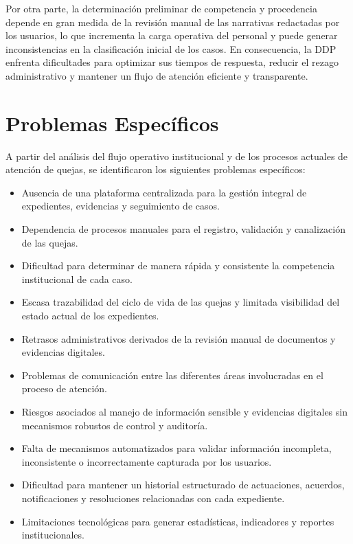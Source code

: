 Por otra parte, la determinación preliminar de competencia y procedencia depende en gran medida de la revisión manual de las narrativas redactadas por los usuarios, lo que incrementa la carga operativa del personal y puede generar inconsistencias en la clasificación inicial de los casos. En consecuencia, la DDP enfrenta dificultades para optimizar sus tiempos de respuesta, reducir el rezago administrativo y mantener un flujo de atención eficiente y transparente.

\section{Problemas Específicos}

A partir del análisis del flujo operativo institucional y de los procesos actuales de atención de quejas, se identificaron los siguientes problemas específicos:

\begin{itemize}

    \item Ausencia de una plataforma centralizada para la gestión integral de expedientes, evidencias y seguimiento de casos.

    \item Dependencia de procesos manuales para el registro, validación y canalización de las quejas.

    \item Dificultad para determinar de manera rápida y consistente la competencia institucional de cada caso.

    \item Escasa trazabilidad del ciclo de vida de las quejas y limitada visibilidad del estado actual de los expedientes.

    \item Retrasos administrativos derivados de la revisión manual de documentos y evidencias digitales.

    \item Problemas de comunicación entre las diferentes áreas involucradas en el proceso de atención.

    \item Riesgos asociados al manejo de información sensible y evidencias digitales sin mecanismos robustos de control y auditoría.

    \item Falta de mecanismos automatizados para validar información incompleta, inconsistente o incorrectamente capturada por los usuarios.

    \item Dificultad para mantener un historial estructurado de actuaciones, acuerdos, notificaciones y resoluciones relacionadas con cada expediente.

    \item Limitaciones tecnológicas para generar estadísticas, indicadores y reportes institucionales.

\end{itemize}

